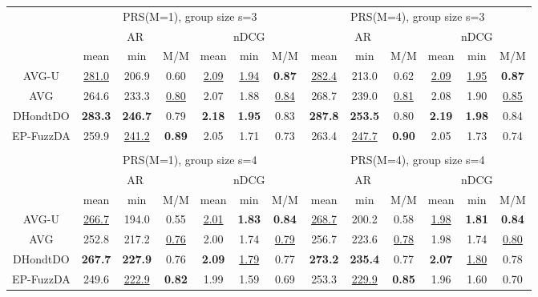 \begin{tabular}{ c | c c c | c c c || c c c | c c c }

\multicolumn{1}{c}{} & \multicolumn{6}{c}{PRS(M=1), group size s=3} & \multicolumn{6}{c}{PRS(M=4), group size s=3} \\
\multicolumn{1}{c}{} & \multicolumn{3}{c}{AR} & \multicolumn{3}{c}{nDCG} & \multicolumn{3}{c}{AR} & \multicolumn{3}{c}{nDCG} \\
& mean & min & M/M & mean & min & M/M & mean & min & M/M & mean & min & M/M \\
\hline
AVG-U & \underline{281.0} & 206.9 & 0.60 & \underline{2.09} & \underline{1.94} & \textbf{0.87} & \underline{282.4} & 213.0 & 0.62 & \underline{2.09} & \underline{1.95} & \textbf{0.87} \\
AVG & 264.6 & 233.3 & \underline{0.80} & 2.07 & 1.88 & \underline{0.84} & 268.7 & 239.0 & \underline{0.81} & 2.08 & 1.90 & \underline{0.85} \\
DHondtDO & \textbf{283.3} & \textbf{246.7} & 0.79 & \textbf{2.18} & \textbf{1.95} & 0.83 & \textbf{287.8} & \textbf{253.5} & 0.80 & \textbf{2.19} & \textbf{1.98} & 0.84 \\
EP-FuzzDA & 259.9 & \underline{241.2} & \textbf{0.89} & 2.05 & 1.71 & 0.73 & 263.4 & \underline{247.7} & \textbf{0.90} & 2.05 & 1.73 & 0.74 \\

\multicolumn{12}{c}{} \\
\multicolumn{1}{c}{} & \multicolumn{6}{c}{PRS(M=1), group size s=4} & \multicolumn{6}{c}{PRS(M=4), group size s=4} \\
\multicolumn{1}{c}{} & \multicolumn{3}{c}{AR} & \multicolumn{3}{c}{nDCG} & \multicolumn{3}{c}{AR} & \multicolumn{3}{c}{nDCG} \\
& mean & min & M/M & mean & min & M/M & mean & min & M/M & mean & min & M/M \\
\hline
AVG-U & \underline{266.7} & 194.0 & 0.55 & \underline{2.01} & \textbf{1.83} & \textbf{0.84} & \underline{268.7} & 200.2 & 0.58 & \underline{1.98} & \textbf{1.81} & \textbf{0.84} \\
AVG & 252.8 & 217.2 & \underline{0.76} & 2.00 & 1.74 & \underline{0.79} & 256.7 & 223.6 & \underline{0.78} & 1.98 & 1.74 & \underline{0.80} \\
DHondtDO & \textbf{267.7} & \textbf{227.9} & 0.76 & \textbf{2.09} & \underline{1.79} & 0.77 & \textbf{273.2} & \textbf{235.4} & 0.77 & \textbf{2.07} & \underline{1.80} & 0.78 \\
EP-FuzzDA & 249.6 & \underline{222.9} & \textbf{0.82} & 1.99 & 1.59 & 0.69 & 253.3 & \underline{229.9} & \textbf{0.85} & 1.96 & 1.60 & 0.70 \\


\end{tabular}
